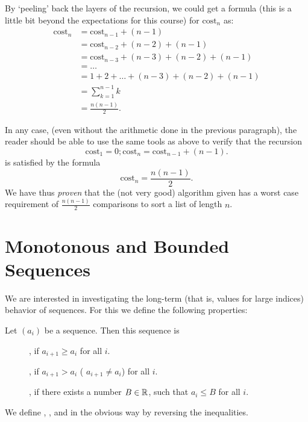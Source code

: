 By `peeling' back the layers of the recursion, we could get a formula (this
is a little bit beyond the expectations for this course) for
$\text{cost}_n$ as:
\begin{align*}
\text{cost}_n &=  \text{cost}_{n-1} + (n-1) \\
&=  \text{cost}_{n-2} +(n-2) + (n-1) \\
& =  \text{cost}_{n-3} + (n-3) +(n-2)+(n-1) \\
&=\ldots \\
&= 1 + 2 + \ldots + (n-3) + (n-2) + (n-1) \\
&= \sum_{k=1}^{n-1} k \\
&= \frac{n(n-1)}{2}.
\end{align*}

In any case, (even without the arithmetic done in the previous paragraph),
the reader should be able to use the same tools as above to verify that the
recursion
\[
\text{cost}_1=0; \text{cost}_n = \text{cost}_{n-1} + (n-1).
\]
is satisfied by the formula
\[
\text{cost}_n = \frac{n(n-1)}{2}.
\]
We have thus {\em proven} that the (not very good) algorithm given has a worst
case requirement of $\frac{n(n-1)}{2}$ comparisons to sort a list of length
$n$.


\section{Monotonous and Bounded Sequences}

We are interested in investigating the long-term (that is, values for large indices)
behavior of sequences. For this we define the following properties:
\begin{defn}
Let $(a_i)$ be a sequence. Then this sequence is
\begin{description}
\item[], if $a_{i+1}\ge a_i$ for all $i$.
\item[], if $a_{i+1}> a_i$ 
( $a_{i+1}\not=a_i$) for all $i$.
\item[], if there exists a number $B\in{\mathbb R}$, such that $a_i\le B$ for all $i$.
\end{description}
We define , ,
and  in the obvious way by reversing the inequalities.
\end{defn}

